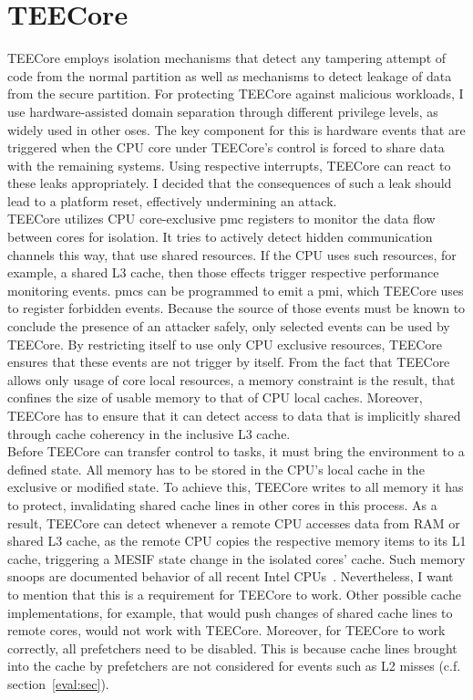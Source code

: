 \section{TEECore}
\label{sec:30:tee_kernel}
TEECore employs isolation mechanisms that detect any tampering attempt of code
from the normal partition as well as mechanisms to detect leakage of data from
the secure partition. For protecting TEECore against malicious workloads, I use
hardware-assisted domain separation through different privilege levels, as
widely used in other \gls{os}es. The key component for this is hardware events
that are triggered when the CPU core under TEECore's control is forced to share
data with the remaining systems. Using respective interrupts, TEECore can react
to these leaks appropriately. I decided that the consequences of such a leak
should lead to a platform reset, effectively undermining an attack.\\

TEECore utilizes CPU core-exclusive \gls{pmc} registers to monitor the data flow
between cores for isolation. It tries to actively detect hidden communication
channels this way, that use shared resources. If the CPU uses such resources,
for example, a shared L3 cache, then those effects trigger respective
performance monitoring events. \glspl{pmc} can be programmed to emit a
\gls{pmi}, which TEECore uses to register forbidden events. Because the source
of those events must be known to conclude the presence of an attacker safely,
only selected events can be used by TEECore. By restricting itself to use only
CPU exclusive resources, TEECore ensures that these events are not trigger by
itself. From the fact that TEECore allows only usage of core local resources, a
memory constraint is the result, that confines the size of usable memory to
that of CPU local caches. Moreover, TEECore has to ensure that it can detect
access to data that is implicitly shared through cache coherency in the
inclusive L3 cache.\\

Before TEECore can transfer control to tasks, it must bring the environment
to a defined state. All memory has to be stored in the CPU's local cache in the
exclusive or modified state. To achieve this, TEECore writes to all memory it
has to protect, invalidating shared cache lines in other cores in this process.
As a result, TEECore can detect whenever a remote CPU accesses data from RAM or
shared L3 cache, as the remote CPU copies the respective memory items to its L1
cache, triggering a MESIF state change in the isolated cores' cache. Such memory
snoops are documented behavior of all recent Intel CPUs~\cite{intel_sdm}.
Nevertheless, I want to mention that this is a requirement for TEECore to work.
Other possible cache implementations, for example, that would push changes of
shared cache lines to remote cores, would not work with TEECore. Moreover, for
TEECore to work correctly, all prefetchers need to be disabled. This is because
cache lines brought into the cache by prefetchers are not considered for events
such as L2 misses (c.f. section~\ref{eval:sec}).\\

